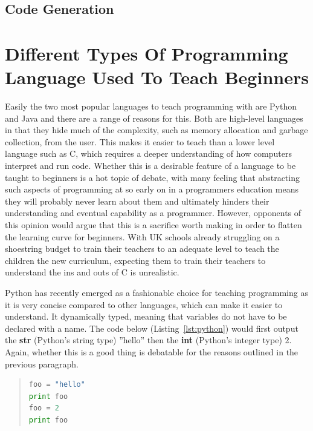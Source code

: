 \documentclass[ %
                    author={Jonathan Rankin},
                supervisor={Dr. David May, Dr. Ian Holyer},
                    degree={MEng},
                     title={CodeTouch},
                  subtitle={A Revolutionary Way To Program Real Code On Touch Screen Devices},
                      type={enterprise},
                      year={2015 } ]{dissertation}
\begin{document}
\subsection{Code Generation}


\section{Different Types Of Programming Language Used To Teach Beginners}\label{sec:teachL}

Easily the two most popular languages to teach programming with are Python and Java \cite{javapython}and there are a range of reasons for this. Both are high-level languages in that they hide much of the complexity, such as memory allocation and garbage collection, from the user. This makes it easier to teach than a lower level language such as C, which requires a deeper understanding of how computers interpret and run code. Whether this is a desirable feature of a language to be taught to beginners is a hot topic of debate, with many feeling that abstracting such aspects of programming at so early on in a programmers education means they will probably never learn about them and ultimately hinders their understanding and eventual capability as a programmer. However, opponents of this opinion would argue that this is a sacrifice worth making in order to flatten the learning curve for beginners. With UK schools already struggling on a shoestring budget to train their teachers to an adequate level to teach the children the new curriculum, expecting them to train their teachers to understand the ins and outs of C is unrealistic. 

Python has recently emerged as a fashionable choice for teaching programming as it is very concise compared to other languages, which can make it easier to understand. It dynamically typed, meaning that variables do not have to be declared with a name. The code below (Listing~\ref{lst:python}) would first output the \textbf{str} (Python's string type) ''hello'' then the \textbf{int} (Python's integer type) 2. Again, whether this is a good thing is debatable for the reasons outlined in the previous paragraph. 

\begin{quote}
\begin{lstlisting}[caption={Example Python code},label={lst:python},language=Python]
foo = "hello"
print foo
foo = 2
print foo
\end{lstlisting}
\label{lst:label}
\end{quote}
\end{document}
